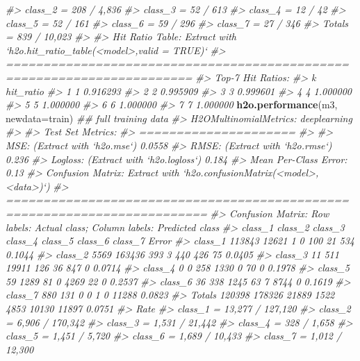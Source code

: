 \documentclass[]{book}
\newenvironment{Shaded}{\begin{snugshade}}{\end{snugshade}}
\newcommand{\CommentTok}[1]{\textcolor[rgb]{0.56,0.35,0.01}{\textit{#1}}}
\newcommand{\DataTypeTok}[1]{\textcolor[rgb]{0.13,0.29,0.53}{#1}}
\newcommand{\KeywordTok}[1]{\textcolor[rgb]{0.13,0.29,0.53}{\textbf{#1}}}
\newcommand{\NormalTok}[1]{#1}
\begin{document}
\begin{Shaded}
\begin{Highlighting}[]
\CommentTok{#> class_2 =  208 / 4,836}
\CommentTok{#> class_3 =     52 / 613}
\CommentTok{#> class_4 =      12 / 42}
\CommentTok{#> class_5 =     52 / 161}
\CommentTok{#> class_6 =     59 / 296}
\CommentTok{#> class_7 =     27 / 346}
\CommentTok{#> Totals  = 839 / 10,023}
\CommentTok{#> }
\CommentTok{#> Hit Ratio Table: Extract with `h2o.hit_ratio_table(<model>,valid = TRUE)`}
\CommentTok{#> =======================================================================}
\CommentTok{#> Top-7 Hit Ratios: }
\CommentTok{#>   k hit_ratio}
\CommentTok{#> 1 1  0.916293}
\CommentTok{#> 2 2  0.995909}
\CommentTok{#> 3 3  0.999601}
\CommentTok{#> 4 4  1.000000}
\CommentTok{#> 5 5  1.000000}
\CommentTok{#> 6 6  1.000000}
\CommentTok{#> 7 7  1.000000}
\KeywordTok{h2o.performance}\NormalTok{(m3, }\DataTypeTok{newdata=}\NormalTok{train)    }\CommentTok{## full training data}
\CommentTok{#> H2OMultinomialMetrics: deeplearning}
\CommentTok{#> }
\CommentTok{#> Test Set Metrics: }
\CommentTok{#> =====================}
\CommentTok{#> }
\CommentTok{#> MSE: (Extract with `h2o.mse`) 0.0558}
\CommentTok{#> RMSE: (Extract with `h2o.rmse`) 0.236}
\CommentTok{#> Logloss: (Extract with `h2o.logloss`) 0.184}
\CommentTok{#> Mean Per-Class Error: 0.13}
\CommentTok{#> Confusion Matrix: Extract with `h2o.confusionMatrix(<model>, <data>)`)}
\CommentTok{#> =========================================================================}
\CommentTok{#> Confusion Matrix: Row labels: Actual class; Column labels: Predicted class}
\CommentTok{#>         class_1 class_2 class_3 class_4 class_5 class_6 class_7  Error}
\CommentTok{#> class_1  113843   12621       1       0     100      21     534 0.1044}
\CommentTok{#> class_2    5569  163436     393       3     440     426      75 0.0405}
\CommentTok{#> class_3      11     511   19911     126      36     847       0 0.0714}
\CommentTok{#> class_4       0       0     258    1330       0      70       0 0.1978}
\CommentTok{#> class_5      59    1289      81       0    4269      22       0 0.2537}
\CommentTok{#> class_6      36     338    1245      63       7    8744       0 0.1619}
\CommentTok{#> class_7     880     131       0       0       1       0   11288 0.0823}
\CommentTok{#> Totals   120398  178326   21889    1522    4853   10130   11897 0.0751}
\CommentTok{#>                       Rate}
\CommentTok{#> class_1 = 13,277 / 127,120}
\CommentTok{#> class_2 =  6,906 / 170,342}
\CommentTok{#> class_3 =   1,531 / 21,442}
\CommentTok{#> class_4 =      328 / 1,658}
\CommentTok{#> class_5 =    1,451 / 5,720}
\CommentTok{#> class_6 =   1,689 / 10,433}
\CommentTok{#> class_7 =   1,012 / 12,300}

\end{Highlighting}
\end{Shaded}
\end{document}
